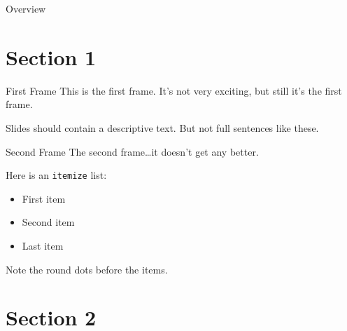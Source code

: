 
\begin{frame}{Overview}
  \tableofcontents
\end{frame}


\section{Section 1}

\begin{frame}{First Frame}
  This is the first frame.
  It's not very exciting, but still it's the first frame.

  Slides should contain a descriptive text.
  But not full sentences like these.
\end{frame}

\begin{frame}{Second Frame}
  The second frame\dots it doesn't get any better.

  Here is an \texttt{itemize} list:
  \begin{itemize}
    \item
          First item

    \item
          Second item

    \item
          Last item
  \end{itemize}
  Note the round dots before the items.
\end{frame}


\section{Section 2}

\usetikzlibrary{decorations.text}

